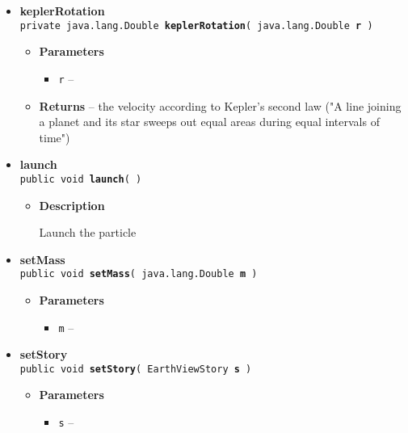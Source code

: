 {{{\begin{itemize}
{\begin{itemize}
{Method to check whether the particle has been launched
}
\item{{\bf Returns} -- 
true if the particle has been launched 
}%
\end{itemize}
}%
 \item{ 
{\bf keplerRotation}\\
{\tt private java.lang.Double\ {\bf keplerRotation}( {\tt java.lang.Double} {\bf r} )
\label{amber.showoff.Particle.keplerRotation(java.lang.Double)}}%
\begin{itemize}
\item{
{\bf Parameters}
  \begin{itemize}
   \item{
{\tt r} -- }
  \end{itemize}
}%
\item{{\bf Returns} -- 
the velocity according to Kepler's second law ("A line joining a planet and its star sweeps out equal areas during equal intervals of time") 
}%
\end{itemize}
}%
 \item{ 
{\bf launch}\\
{\tt public void\ {\bf launch}(  )
\label{amber.showoff.Particle.launch()}}%
\begin{itemize}
\item{
{\bf Description}

Launch the particle
}
\end{itemize}
}%
 \item{ 
{\bf setMass}\\
{\tt public void\ {\bf setMass}( {\tt java.lang.Double} {\bf m} )
\label{amber.showoff.Particle.setMass(java.lang.Double)}}%
\begin{itemize}
\item{
{\bf Parameters}
  \begin{itemize}
   \item{
{\tt m} -- }
  \end{itemize}
}%
\end{itemize}
}%
 \item{ 
{\bf setStory}\\
{\tt public void\ {\bf setStory}( {\tt EarthViewStory} {\bf s} )
\label{amber.showoff.Particle.setStory(amber.showoff.EarthViewStory)}}%
\begin{itemize}
\item{
{\bf Parameters}
  \begin{itemize}
   \item{
{\tt s} -- }
  \end{itemize}
}%
\end{itemize}
}%
\end{itemize}
}
}
}
